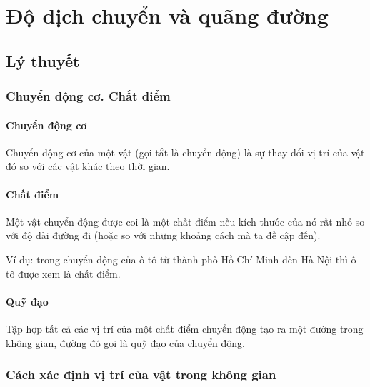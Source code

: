\let\lesson\undefined
\newcommand{\lesson}{\phantomlesson{Bài 4: Chuyển động thẳng}}
\chapter[Độ dịch chuyển và quãng đường]{Độ dịch chuyển và quãng đường}
\setcounter{section}{0}
\section{Lý thuyết}
\subsection{Chuyển động cơ. Chất điểm}
\subsubsection{Chuyển động cơ}
Chuyển động cơ của một vật (gọi tắt là chuyển động) là sự thay đổi vị trí của vật đó so với các vật khác theo thời gian.
\subsubsection{Chất điểm}
Một vật chuyển động được coi là một chất điểm nếu kích thước của nó rất nhỏ so với độ dài đường đi (hoặc so với những khoảng cách mà ta đề cập đến).

Ví dụ: trong chuyển động của ô tô từ thành phố Hồ Chí Minh đến Hà Nội thì ô tô được xem là chất điểm.
\subsubsection{Quỹ đạo}
Tập hợp tất cả các vị trí của một chất điểm chuyển động tạo ra một đường trong không gian, đường đó gọi là quỹ đạo của chuyển động.
\subsection{Cách xác định vị trí của vật trong không gian}
